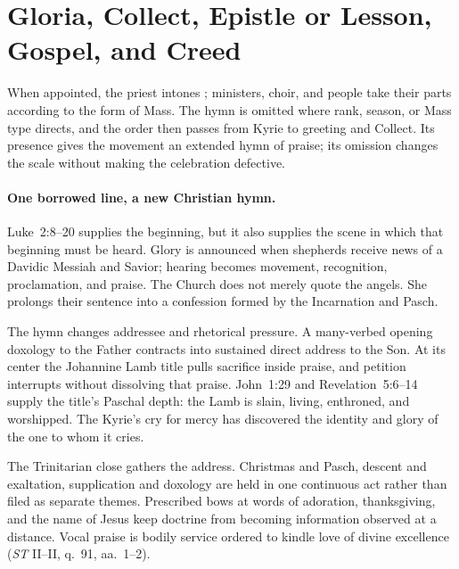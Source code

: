 \section{Gloria, Collect, Epistle or Lesson, Gospel, and Creed}


When appointed, the priest intones ; ministers, choir, and people take their parts according to the form of Mass. The hymn is omitted where rank, season, or Mass type directs, and the order then passes from Kyrie to greeting and Collect. Its presence gives the movement an extended hymn of praise; its omission changes the scale without making the celebration defective.

\paragraph{One borrowed line, a new Christian hymn.}
Luke~2:8--20 supplies the beginning, but it also supplies the scene in which that beginning must be heard. Glory is announced when shepherds receive news of a Davidic Messiah and Savior; hearing becomes movement, recognition, proclamation, and praise. The Church does not merely quote the angels. She prolongs their sentence into a confession formed by the Incarnation and Pasch.

The hymn changes addressee and rhetorical pressure. A many-verbed opening doxology to the Father contracts into sustained direct address to the Son. At its center the Johannine Lamb title pulls sacrifice inside praise, and petition interrupts without dissolving that praise. John~1:29 and Revelation~5:6--14 supply the title's Paschal depth: the Lamb is slain, living, enthroned, and worshipped. The Kyrie's cry for mercy has discovered the identity and glory of the one to whom it cries.

The Trinitarian close gathers the address. Christmas and Pasch, descent and exaltation, supplication and doxology are held in one continuous act rather than filed as separate themes. Prescribed bows at words of adoration, thanksgiving, and the name of Jesus keep doctrine from becoming information observed at a distance. Vocal praise is bodily service ordered to kindle love of divine excellence (\emph{ST} II--II, q.~91, aa.~1--2).

